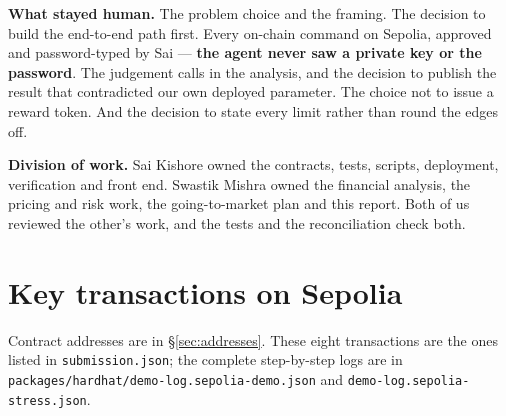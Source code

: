 \documentclass[11pt,a4paper]{article}
\begin{document}
\textbf{What stayed human.} The problem choice and the framing. The decision to build the end-to-end
path first. Every on-chain command on Sepolia, approved and password-typed by Sai --- \textbf{the
agent never saw a private key or the password}. The judgement calls in the analysis, and the decision to publish the result
that contradicted our own deployed parameter. The choice not to issue a reward token. And the
decision to state every limit rather than round the edges off.

\textbf{Division of work.} Sai Kishore owned the contracts, tests, scripts, deployment, verification
and front end. Swastik Mishra owned the financial analysis, the pricing and risk work, the
going-to-market plan and this report. Both of us reviewed the other's work, and the tests and the
reconciliation check both.

\clearpage
\appendix
\section{Key transactions on Sepolia}\label{app:addresses}

Contract addresses are in \S\ref{sec:addresses}. These eight transactions are the ones listed in
\texttt{submission.json}; the complete step-by-step logs are in
\nolinkurl{packages/hardhat/demo-log.sepolia-demo.json} and
\nolinkurl{demo-log.sepolia-stress.json}.
\end{document}
